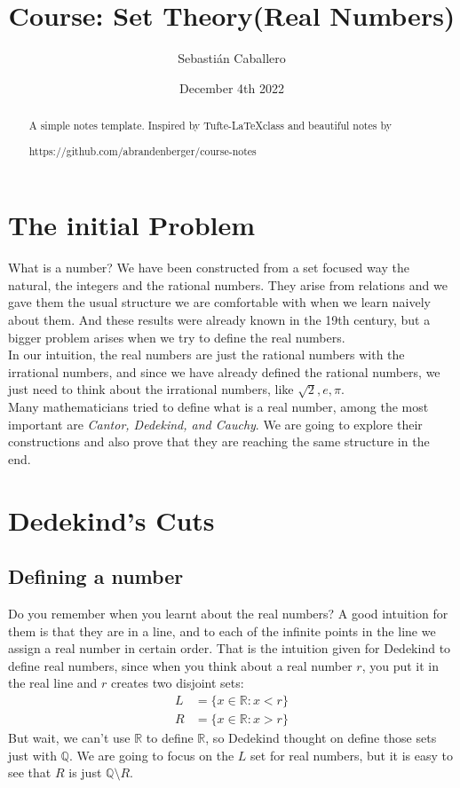 \documentclass{tufte-handout}
\title{Course: Set Theory(Real Numbers)}
\author{Sebastián Caballero}
\date{December 4th 2022}
\begin{document}
\maketitle

\begin{abstract}
\noindent
A simple notes template. Inspired by Tufte-\LaTeX class and beautiful notes by \begin{verbatim*}
	https://github.com/abrandenberger/course-notes
\end{verbatim*}
\end{abstract}
\section{The initial Problem}
What is a number? We have been constructed from a set focused way the natural, the integers and the rational numbers. They arise from relations and we gave them the usual structure we are comfortable with when we learn naively about them. And these results were already known in the 19th century, but a bigger problem arises when we try to define the real numbers.\\

In our intuition, the real numbers are just the rational numbers with the irrational numbers, and since we have already defined the rational numbers, we just need to think about the irrational numbers, like $\sqrt{2}, e, \pi$.\\

Many mathematicians tried to define what is a real number, among the most important are \textit{Cantor, Dedekind, and Cauchy}. We are going to explore their constructions and also prove that they are reaching the same structure in the end.

\section{Dedekind's Cuts}
\subsection{Defining a number}
Do you remember when you learnt about the real numbers? A good intuition for them is that they are in a line, and to each of the infinite points in the line we assign a real number in certain order. That is the intuition given for Dedekind to define real numbers, since when you think about a real number $r$, you put it in the real line and $r$ creates two disjoint sets:
\begin{align*}
	L &= \{x \in \mathbb{R} : x < r\}\\
	R &= \{x \in \mathbb{R} : x > r\}
\end{align*}
But wait, we can't use $\mathbb{R}$ to define $\mathbb{R}$, so Dedekind thought on define those sets just with $\mathbb{Q}$. We are going to focus on the $L$ set for real numbers, but it is easy to see that $R$ is just $\mathbb{Q} \setminus R$.\\
\end{document}
